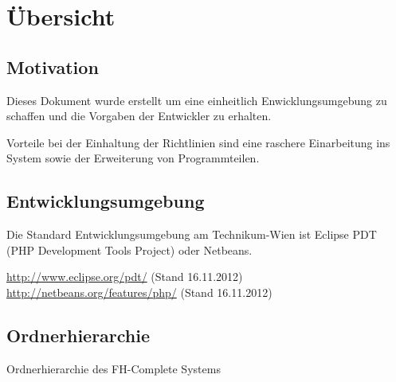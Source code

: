 \chapter{\"Ubersicht}
\section{Motivation}
Dieses Dokument wurde erstellt um eine einheitlich Enwicklungsumgebung zu schaffen und die Vorgaben der Entwickler zu erhalten.

Vorteile bei der Einhaltung der Richtlinien sind eine raschere Einarbeitung ins System sowie der Erweiterung von Programmteilen.

\newpage

\section{Entwicklungsumgebung}

Die Standard Entwicklungsumgebung am Technikum-Wien ist Eclipse PDT (PHP Development Tools Project) oder Netbeans.

\href{http://www.eclipse.org/pdt/}{http://www.eclipse.org/pdt/} (Stand 16.11.2012) \newline
\href{http://netbeans.org/features/php/}{http://netbeans.org/features/php/} (Stand 16.11.2012)

\newpage
\section{Ordnerhierarchie}

Ordnerhierarchie des FH-Complete Systems

